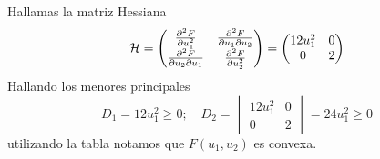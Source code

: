\documentclass[../main]{subfiles}
\begin{document}
Hallamas la matriz Hessiana
\begin{equation*}
    \mathcal{H}=
    \begin{pmatrix}
        \pdv{^2 F}{u^2_1} & \pdv{^2 F}{u_1 \partial u_2} \\
        \pdv{^2 F}{u_2 \partial u_1} & \pdv{^2 F}{u^2_2}
    \end{pmatrix}
    =
    \begin{pmatrix}
        12u^2_1 & 0\\
        0 & 2
    \end{pmatrix}
\end{equation*}
Hallando los menores principales 
\begin{equation*}
    D_1=12u^2_1\geq 0;\quad D_2=
    \begin{vmatrix}
        12u^2_1 & 0 \\
        0 & 2
    \end{vmatrix}
    =24u^2_1\geq 0
\end{equation*}
utilizando la tabla notamos que $F(u_1, u_2)$ es convexa.
\end{document}
